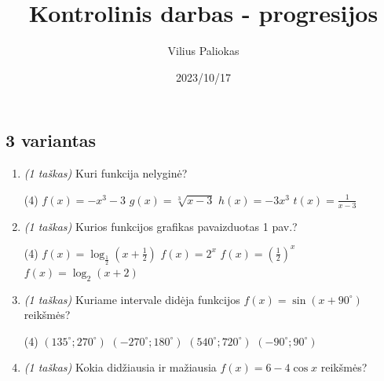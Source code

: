 \documentclass[a4paper]{article}
\title{Kontrolinis darbas - progresijos}
\author{Vilius Paliokas}
\date{2023/10/17}
\begin{document}
\thispagestyle{fancy}

\titlespacing*{\subsection}{0pt}{.75ex}{0.75ex}

\subsection*{3 variantas}

\begin{enumerate}
      \item \textit{(1 taškas)} Kuri funkcija nelyginė?
            \begin{tasks}[item-format={\normalfont}, after-item-skip=2mm,
                        label=\Alph*, label-format={\bfseries}](4)
                  \task $f(x)=-x^3-3$
                  \task $g(x)=\sqrt[3]{x-3}$
                  \task $h(x)=-3x^3$
                  \task $t(x)=\frac{1}{x-3}$
            \end{tasks}

      \item \textit{(1 taškas)} Kurios funkcijos grafikas pavaizduotas 1 pav.?
            \begin{tasks}[item-format={\normalfont}, after-item-skip=2mm,
                        label=\Alph*, label-format={\bfseries}](4)
                  \task $f(x)=\log_{\frac{1}{2}}(x+\frac{1}{2})$
                  \task $f(x)=2^x$
                  \task $f(x)=(\frac{1}{2})^x$
                  \task $f(x)=\log_{2}(x+2)$
            \end{tasks}

      \item \textit{(1 taškas)} Kuriame intervale didėja funkcijos
            $f(x)=\sin(x+90^\circ)$ reikšmės?
            \begin{tasks}[item-format={\normalfont}, after-item-skip=2mm,
                        label=\Alph*, label-format={\bfseries}](4)
                  \task $(135^\circ; 270^\circ)$
                  \task $(-270^\circ; 180^\circ)$
                  \task $(540^\circ; 720^\circ)$
                  \task $(-90^\circ; 90^\circ)$
            \end{tasks}

      \item \textit{(1 taškas)} Kokia didžiausia ir mažiausia $f(x)=6-4\cos{x}$
            reikšmės?
            \vspace{7mm}


\end{enumerate}
\end{document}
